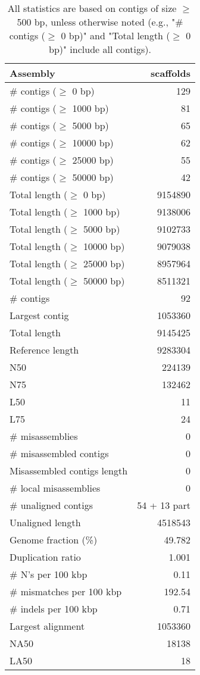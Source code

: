 \documentclass[12pt,a4paper]{article}
\begin{document}
\begin{table}[ht]
\begin{center}
\caption{All statistics are based on contigs of size $\geq$ 500 bp, unless otherwise noted (e.g., "\# contigs ($\geq$ 0 bp)" and "Total length ($\geq$ 0 bp)" include all contigs).}
\begin{tabular}{|l*{1}{|r}|}
\hline
Assembly & scaffolds \\ \hline
\# contigs ($\geq$ 0 bp) & 129 \\ \hline
\# contigs ($\geq$ 1000 bp) & 81 \\ \hline
\# contigs ($\geq$ 5000 bp) & 65 \\ \hline
\# contigs ($\geq$ 10000 bp) & 62 \\ \hline
\# contigs ($\geq$ 25000 bp) & 55 \\ \hline
\# contigs ($\geq$ 50000 bp) & 42 \\ \hline
Total length ($\geq$ 0 bp) & 9154890 \\ \hline
Total length ($\geq$ 1000 bp) & 9138006 \\ \hline
Total length ($\geq$ 5000 bp) & 9102733 \\ \hline
Total length ($\geq$ 10000 bp) & 9079038 \\ \hline
Total length ($\geq$ 25000 bp) & 8957964 \\ \hline
Total length ($\geq$ 50000 bp) & 8511321 \\ \hline
\# contigs & 92 \\ \hline
Largest contig & 1053360 \\ \hline
Total length & 9145425 \\ \hline
Reference length & 9283304 \\ \hline
N50 & 224139 \\ \hline
N75 & 132462 \\ \hline
L50 & 11 \\ \hline
L75 & 24 \\ \hline
\# misassemblies & 0 \\ \hline
\# misassembled contigs & 0 \\ \hline
Misassembled contigs length & 0 \\ \hline
\# local misassemblies & 0 \\ \hline
\# unaligned contigs & 54 + 13 part \\ \hline
Unaligned length & 4518543 \\ \hline
Genome fraction (\%) & 49.782 \\ \hline
Duplication ratio & 1.001 \\ \hline
\# N's per 100 kbp & 0.11 \\ \hline
\# mismatches per 100 kbp & 192.54 \\ \hline
\# indels per 100 kbp & 0.71 \\ \hline
Largest alignment & 1053360 \\ \hline
NA50 & 18138 \\ \hline
LA50 & 18 \\ \hline
\end{tabular}
\end{center}
\end{table}
\end{document}

